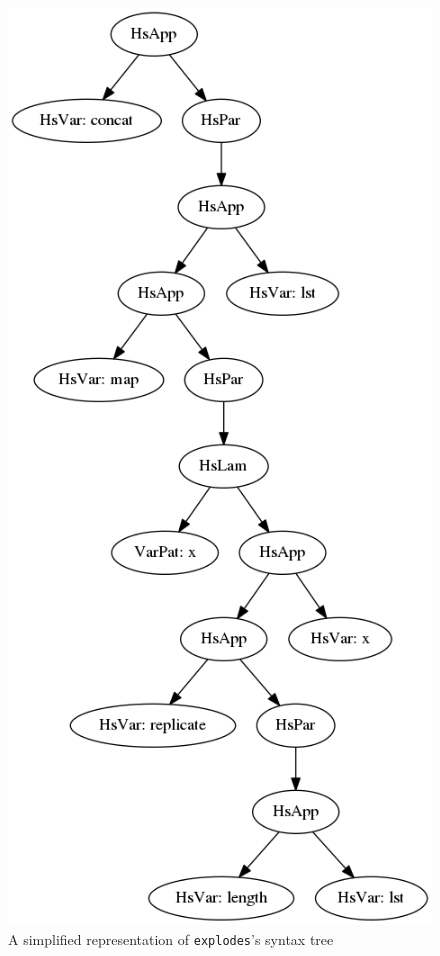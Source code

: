 \begin{figure}[h!]
	\begin{center}
		\includegraphics[scale=.5]{graphVis/Chapter3/explode.png}
	\end{center}
	\caption{A simplified representation of \texttt{explodes}'s syntax tree}
	\label{explode}
\end{figure}


